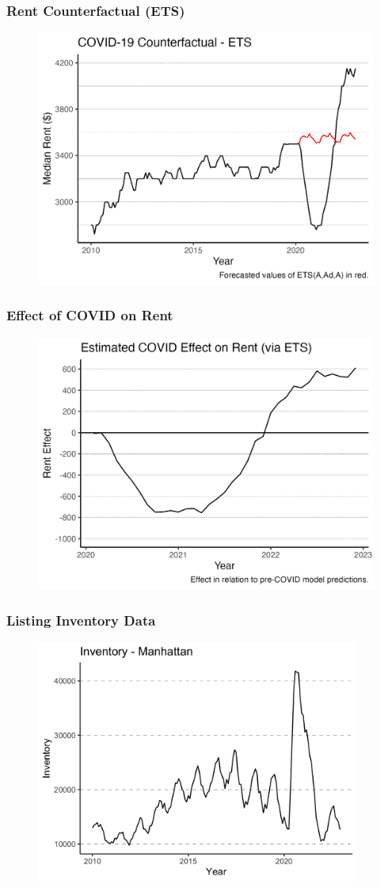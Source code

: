 \documentclass[t]{beamer}
\begin{document}
\begin{frame}
\frametitle{Rent Counterfactual (ETS)}
\begin{figure}
\includegraphics[width= 4.2 in]{rent_counterfactual_ets.png}
\end{figure}
\end{frame}

\begin{frame}
\frametitle{Effect of COVID on Rent}
\begin{figure}
\includegraphics[width= 4.2 in]{rent_covid_effect_ets.png}
\end{figure}
\end{frame}

\begin{frame}
\frametitle{Listing Inventory Data}
\begin{figure}
\includegraphics[width=4.2in]{inventory_raw_series.png}
\end{figure}
\end{frame}
\end{document}
